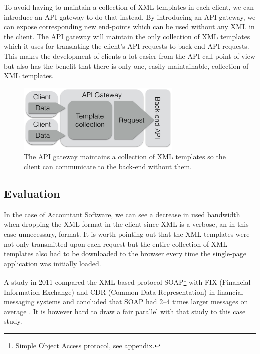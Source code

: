 \documentclass{cslthse-msc}
\begin{document}
To avoid having to maintain a collection of XML templates in each client, we can introduce an API gateway to do that instead. By introducing an API gateway, we can expose corresponding new end-points which can be used without any XML in the client. The API gateway will maintain the only collection of XML templates which it uses for translating the client's API-requests to back-end API requests. This makes the development of clients a lot easier from the API-call point of view but also has the benefit that there is only one, easily maintainable, collection of XML templates.

\begin{figure}[H]
  \centering
    \begin{center}
      \includegraphics[width=0.7\textwidth]{images/gateway_templates.png}
    \end{center}
  \caption{The API gateway maintains a collection of XML templates so the client can communicate to the back-end without them.}
\end{figure}

\subsection{Evaluation}

In the case of Accountant Software, we can see a decrease in used bandwidth when dropping the XML format in the client since XML is a verbose, an in this case unnecessary, format. It is worth pointing out that the XML templates were not only transmitted upon each request but the entire collection of XML templates also had to be downloaded to the browser every time the single-page application was initially loaded. 

A study in 2011 compared the XML-based protocol SOAP\footnote{Simple Object Access protocol, see appendix.} with FIX (Financial Information Exchange) and CDR (Common Data Representation) in financial messaging systems and concluded that SOAP had 2--4 times larger messages on average \cite{soap_fix}. It is however hard to draw a fair parallel with that study to this case study.
\end{document}

